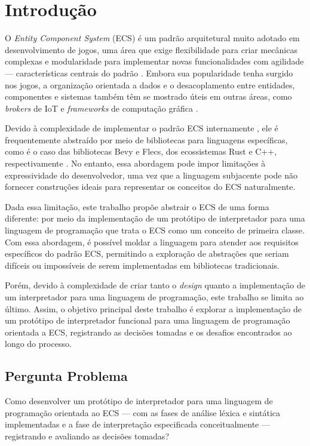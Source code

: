 \chapter{Introdução} \label{ch:introducao}

O \textit{Entity Component System} (ECS) é um padrão arquitetural muito adotado em desenvolvimento de jogos, uma área que exige flexibilidade para criar mecânicas complexas e modularidade para implementar novas funcionalidades com agilidade — características centrais do padrão \cite{ecsfaq}. Embora sua popularidade tenha surgido nos jogos, a organização orientada a dados e o desacoplamento entre entidades, componentes e sistemas também têm se mostrado úteis em outras áreas, como \textit{brokers} de IoT e \textit{frameworks} de computação gráfica \cite{ecsiotbrokers, ecscomputergraphics}.

Devido à complexidade de implementar o padrão ECS internamente \cite{ecsstorageinpics}, ele é frequentemente abstraído por meio de bibliotecas para linguagens específicas, como é o caso das bibliotecas Bevy e Flecs, dos ecossistemas Rust e C++, respectivamente \cite{bevy, flecs}. No entanto, essa abordagem pode impor limitações à expressividade do desenvolvedor, uma vez que a linguagem subjacente pode não fornecer construções ideais para representar os conceitos do ECS naturalmente.

Dada essa limitação, este trabalho propõe abstrair o ECS de uma forma diferente: por meio da implementação de um protótipo de interpretador para uma linguagem de programação que trata o ECS como um conceito de primeira classe. Com essa abordagem, é possível moldar a linguagem para atender aos requisitos específicos do padrão ECS, permitindo a exploração de abstrações que seriam difíceis ou impossíveis de serem implementadas em bibliotecas tradicionais.

Porém, devido à complexidade de criar tanto o \textit{design} quanto a implementação de um interpretador para uma linguagem de programação, este trabalho se limita ao último. Assim, o objetivo principal deste trabalho é explorar a implementação de um protótipo de interpretador funcional para uma linguagem de programação orientada a ECS, registrando as decisões tomadas e os desafios encontrados ao longo do processo.

\section{Pergunta Problema}

Como desenvolver um protótipo de interpretador para uma linguagem de programação orientada ao ECS — com as fases de análise léxica e sintática implementadas e a fase de interpretação especificada conceitualmente — registrando e avaliando as decisões tomadas?

